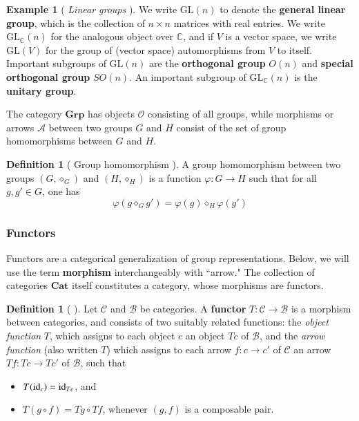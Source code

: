 \documentclass[12pt]{article}
\numberwithin{equation}{section}
\theoremstyle{definition}
\newtheorem{defn}[thm]{Definition}
\newtheorem{eg}{Example}
\newcommand{		\GL		}	{	\textrm{GL}				}
\newcommand{		\id		}	{	{\text{\rm id}}		}
\newcommand{		\grp		}	{	{\mathbf{Grp}}		}
\newcommand{		\B		}	{\textbf					} %
\newcommand{		\1		}	{	\bm{1}					}%
\begin{document}
\vspace{5mm}


\begin{mdframed}
\begin{eg} [ \emph{Linear groups} ] We write $\GL(n)$ to denote the \B{general linear group}, which is the collection of $n \times n$ matrices with real entries. We write $\GL_{\mathbb{C}}(n)$ for the analogous object over $\mathbb{C}$, and if $V$ is a vector space, we write $\GL(V)$ for the group of (vector space) automorphisms from $V$ to itself. Important subgroups of $\GL(n)$ are the \B{orthogonal group} $O(n)$ and \B{special orthogonal group} $SO(n)$. An important subgroup of $\GL_{\mathbb{C}}(n)$ is the \B{unitary group}. 
\end{eg}
\end{mdframed}



\vspace{5mm}

The category $\grp$ has objects $\mathcal{O}$ consisting of all groups, while morphisms or arrows $\mathcal{A}$ between two groups $G$ and $H$ consist of the set of group homomorphisms between $G$ and $H$. 

\begin{defn}[ Group homomorphism ] A group homomorphism between two groups $(G,\diamond_G)$ and $(H,\diamond_H)$ is a function $\varphi: G \to H$ such that for all $g, g' \in G$, one has
$$
\varphi( g \diamond_G g') = \varphi(g) \diamond_H \varphi(g')
$$
\end{defn}



\vspace{5mm}

\subsubsection*{Functors}

\vspace{5mm}

Functors are a categorical generalization of group representations. Below, we will use the term \B{morphism} interchangeably with ``arrow." The collection of categories $\B{Cat}$ itself constitutes a category, whose morphisms are functors. 

\begin{defn}[ \cite{MacLane} ] Let $\mathcal{C}$ and $\mathcal{B}$ be categories. A \B{functor} $T: \mathcal{C} \to \mathcal{B}$ is a morphism between categories, and consists of two suitably related functions: the \emph{object function} $T$, which assigns to each object $c$ an object $Tc$ of $\mathcal{B}$, and the \emph{arrow function} (also written $T$) which assigns to each arrow $f : c \to c'$ of $\mathcal{C}$ an arrow $Tf : Tc \to Tc'$ of $\mathcal{B}$, such that
\begin{itemize}
\item[ \, ] $T(\id_c) = \id_{Tc}$, and
\item[ \, ] $T( g\circ f) = Tg \circ Tf$, whenever $(g,f)$ is a composable pair. 
\end{itemize}
\end{defn}
\end{document}
